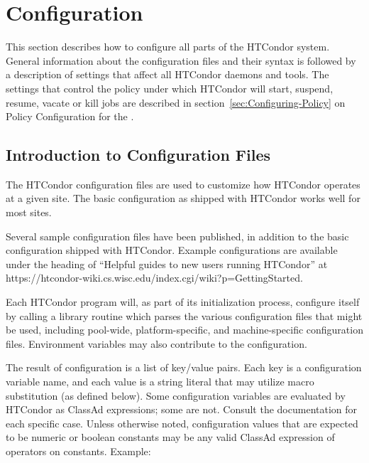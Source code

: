 \section{\label{sec:Configuring-HTCondor}Configuration}


This section describes how to configure all parts of the HTCondor
system.  General information about the configuration
files and their syntax is followed by a description of
settings that affect all
HTCondor daemons and tools.
The 
settings that control the policy under which HTCondor will start,
suspend, resume, vacate or kill jobs
are described in 
section~\ref{sec:Configuring-Policy} on Policy Configuration for the
. 

\subsection{\label{sec:Intro-to-Config-Files}Introduction to
Configuration Files} 

The HTCondor configuration files are used to customize how HTCondor
operates at a given site.  The basic configuration as shipped with
HTCondor works well for most sites.

Several sample configuration files have been published, in addition to the
basic configuration shipped with HTCondor.  Example configurations are
available under the heading of ``Helpful guides to new users running HTCondor''
at https://htcondor-wiki.cs.wisc.edu/index.cgi/wiki?p=GettingStarted.

Each HTCondor program will, as part of its initialization process,
configure itself by calling a library routine which parses the
various configuration files that might be used, including pool-wide,
platform-specific, and machine-specific configuration files.
Environment variables may also contribute to the configuration.

The result of configuration is a list of key/value pairs.
Each key is a configuration variable name,
and each value is a string literal
that may utilize macro substitution (as defined below).
Some configuration variables are evaluated by HTCondor as ClassAd
expressions; some are not.  Consult the documentation for each specific
case.  Unless otherwise noted, configuration values that are expected
to be numeric or boolean constants may be any valid ClassAd expression
of operators on constants.  Example:

